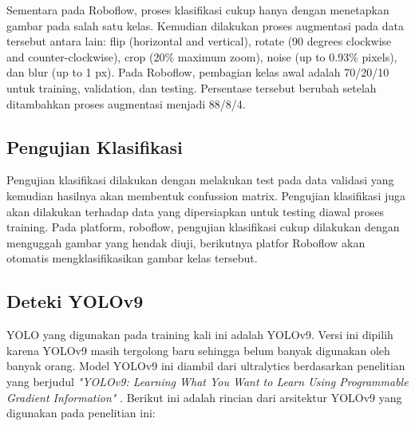 Sementara pada Roboflow, proses klasifikasi cukup hanya dengan menetapkan gambar pada salah satu kelas. Kemudian dilakukan proses augmentasi pada data tersebut antara lain: flip (horizontal and vertical), rotate (90 degrees clockwise and counter-clockwise), crop (20\% maximum zoom), noise (up to 0.93\% pixels), dan blur (up to 1 px). Pada Roboflow, pembagian kelas awal adalah 70/20/10 untuk training, validation, dan testing. Persentase tersebut berubah setelah ditambahkan proses augmentasi menjadi 88/8/4.

\subsection{Pengujian Klasifikasi}
Pengujian klasifikasi dilakukan dengan melakukan test pada data validasi yang kemudian hasilnya akan membentuk confussion matrix. Pengujian klasifikasi juga akan dilakukan terhadap data yang dipersiapkan untuk testing diawal proses training. Pada platform, roboflow, pengujian klasifikasi cukup dilakukan dengan menguggah gambar yang hendak diuji, berikutnya platfor Roboflow akan otomatis mengklasifikasikan gambar kelas tersebut.

\subsection{Deteki YOLOv9}
YOLO yang digunakan pada training kali ini adalah YOLOv9. Versi ini dipilih karena YOLOv9 masih tergolong baru sehingga belum banyak digunakan oleh banyak orang. Model YOLOv9 ini diambil dari ultralytics berdasarkan penelitian yang berjudul \emph{"YOLOv9: Learning What You Want to Learn Using Programmable Gradient Information"} \parencite{wang2024yolov9}. Berikut ini adalah rincian dari arsitektur YOLOv9 yang digunakan pada penelitian ini:


